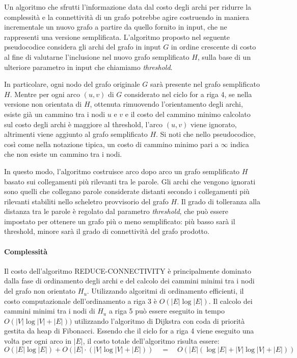 
Un algoritmo che sfrutti l'informazione data dal costo degli archi per ridurre la complessità e la connettività
di un grafo potrebbe agire costruendo in maniera incrementale un nuovo grafo a partire da quello fornito in input,
che ne rappresenti una versione semplificata.
L'algoritmo proposto nel seguente pseudocodice considera gli archi del grafo in input $G$ in ordine crescente di
costo al fine di valutarne l'inclusione nel nuovo grafo semplificato $H$, sulla base di un ulteriore parametro in input
che chiamiamo \textit{threshold}.

In particolare, ogni nodo del grafo originale $G$ sarà presente nel grafo semplificato $H$. Mentre per ogni arco $(u, v)$
di $G$ considerato nel ciclo for a riga 4, se nella versione non orientata di $H$, ottenuta rimuovendo l'orientamento
degli archi, esiste già un cammino tra i nodi $u$ e $v$ e il costo del cammino minimo calcolato sul costo degli archi
è maggiore al threshold, l'arco $(u, v)$ viene ignorato, altrimenti viene aggiunto al grafo semplificato $H$.
Si noti che nello pseudocodice, così come nella notazione tipica, un costo di cammino minimo pari a $\infty$ indica
che non esiste un cammino tra i nodi.



In questo modo, l'algoritmo costruisce arco dopo arco un grafo semplificato $H$ basato sui collegamenti più
rilevanti tra le parole.
Gli archi che vengono ignorati sono quelli che collegano parole considerate distanti secondo i collegamenti più
rilevanti stabiliti nello scheletro provvisorio del grafo $H$.
Il grado di tolleranza alla distanza tra le parole è regolato dal parametro \textit{threshold},
che può essere impostato per ottenere un grafo più o meno semplificato: più basso sarà il threshold, minore
sarà il grado di connettività del grafo prodotto.

\paragraph{Complessità}
Il costo dell'algoritmo REDUCE-CONNECTIVITY è principalmente dominato dalla fase di ordinamento degli archi
e del calcolo dei cammini minimi tra i nodi del grafo non orientato $H_u$.
Utilizzando algoritmi di ordinamento efficienti, il costo computazionale dell'ordinamento a riga 3 è $O(|E| \log |E|)$.
Il calcolo dei cammini minimi tra i nodi di $H_u$ a riga 5 può essere eseguito in tempo $O(|V| \log{|V|} + |E|))$
utilizzando l'algoritmo di Dijkstra con coda di priorità gestita da heap di Fibonacci.
Essendo che il ciclo for a riga 4 viene eseguito una volta per ogni arco in $|E|$, il costo totale dell'algoritmo
risulta essere:
\begin{equation*}
      O(|E| \log |E|) + O(|E| \cdot (|V| \log{|V|} + |E|)) \quad = \quad
      O(|E| (\log |E| + |V| \log{|V|} + |E|))
\end{equation*}

